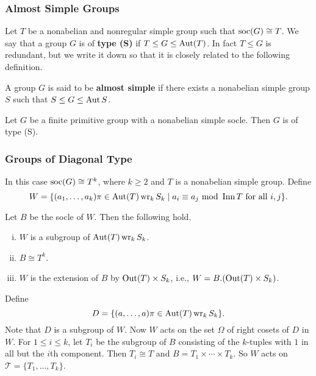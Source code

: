\subsubsection{Almost Simple Groups} Let $T$ be a nonabelian and nonregular simple group such that $\operatorname{soc}(G) \cong T$. We say that a group $G$ is of \textbf{type (S)} if $T\leq G\leq \operatorname{Aut}(T)$. In fact $T\leq G$ is redundant, but we write it down so that it is closely related to the following definition.
\begin{definition}
	A group $G$ is said to be \textbf{almost simple} if there exists a nonabelian simple group $S$ such that $S\leq G\leq \operatorname{Aut} S$.
\end{definition}


\begin{proposition} \label{prop-type-S}
	Let $G$ be a finite primitive group with a nonabelian simple socle. Then $G$ is of type (S).
\end{proposition}






\subsubsection{Groups of Diagonal Type} \label{sec-diagonal-type} In this case $\operatorname{soc}(G)\cong T^k$, where $k\geq 2$ and $T$ is a nonabelian simple group. Define
\begin{equation*}
	W = \{(a_1,\dots, a_k)\pi\in \operatorname{Aut} (T)\operatorname{wr}_k S_k\mid a_i\equiv a_j \text{ mod } \operatorname{Inn} T \text{ for all }i,j\}.
\end{equation*}
\begin{proposition}
	Let $B$ be the socle of $W$. Then the following hold.
	\begin{enumerate}[(i)]
		\item $W$ is a subgroup of $\operatorname{Aut} (T)\operatorname{wr}_k S_k$.
		\item $B\cong T^k$.
		\item $W$ is the extension of $B$ by $\operatorname{Out}(T)\times S_k$, i.e., $W = B.(\operatorname{Out}(T)\times S_k)$.
	\end{enumerate}
\end{proposition}
Define
\begin{equation*}
	D = \{(a,\dots, a)\pi\in \operatorname{Aut} (T)\operatorname{wr}_k S_k\}.
\end{equation*}
Note that $D$ is a subgroup of $W$.  Now $W$ acts on the set $\Omega$ of right cosets of $D$ in $W$. For $1\leq i\leq k$, let $T_i$ be the subgroup of $B$ consisting of the $k$-tuples with $1$ in all but the $i$th component. Then $T_i\cong T$ and $B = T_1\times \cdots \times T_k$. So $W$ acts on $\mathcal{T} = \{T_1,\dots, T_k\}$. 

